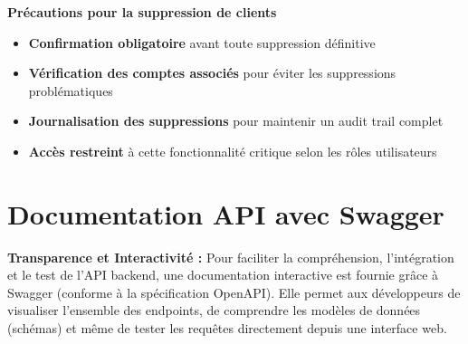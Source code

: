 \documentclass[10pt]{article}
\begin{document}
\vspace{0.8cm}

\begin{tcolorbox}[
    enhanced,
    colback=danger!5,
    colframe=danger,
    arc=5pt,
    left=10pt,right=10pt,top=10pt,bottom=10pt
]
    \begin{center}
        \textbf{\large\sffamily\textcolor{danger}{Précautions pour la suppression de clients}}
    \end{center}
    
    \begin{itemize}[leftmargin=15pt, itemsep=5pt]
        \item \textbf{Confirmation obligatoire} avant toute suppression définitive
        \item \textbf{Vérification des comptes associés} pour éviter les suppressions problématiques
        \item \textbf{Journalisation des suppressions} pour maintenir un audit trail complet
        \item \textbf{Accès restreint} à cette fonctionnalité critique selon les rôles utilisateurs
    \end{itemize}
\end{tcolorbox}


\vspace{0.5cm}


\newpage

\section{Documentation API avec Swagger}

\begin{tcolorbox}[
    colback=lightgray,
    colframe=primaryblue, 
    boxrule=1pt,
    arc=5pt,
    left=10pt,
    right=10pt,
    top=10pt,
    bottom=10pt
]
\textbf{Transparence et Interactivité :} Pour faciliter la compréhension, l'intégration et le test de l'API backend, une documentation interactive est fournie grâce à Swagger (conforme à la spécification OpenAPI). Elle permet aux développeurs de visualiser l'ensemble des endpoints, de comprendre les modèles de données (schémas) et même de tester les requêtes directement depuis une interface web.
\end{tcolorbox}
\end{document}
